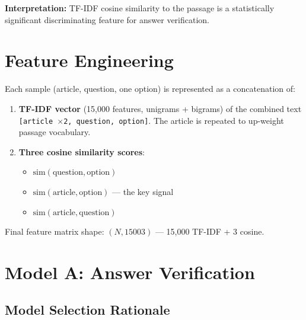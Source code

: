 \documentclass[12pt,a4paper]{article}
\begin{document}
\textbf{Interpretation:} TF-IDF cosine similarity to the passage is a
statistically significant discriminating feature for answer verification.

\section{Feature Engineering}

Each sample (article, question, one option) is represented as a concatenation
of:

\begin{enumerate}
  \item \textbf{TF-IDF vector} (15,000 features, unigrams + bigrams) of the
        combined text \texttt{[article $\times$2, question, option]}.
        The article is repeated to up-weight passage vocabulary.
  \item \textbf{Three cosine similarity scores}:
        \begin{itemize}
          \item $\text{sim}(\text{question}, \text{option})$
          \item $\text{sim}(\text{article}, \text{option})$ — the key signal
          \item $\text{sim}(\text{article}, \text{question})$
        \end{itemize}
\end{enumerate}

Final feature matrix shape: $(N, 15003)$ — 15,000 TF-IDF + 3 cosine.

\section{Model A: Answer Verification}

\subsection{Model Selection Rationale}
\end{document}
